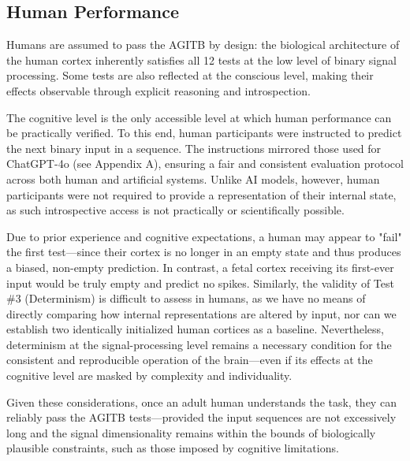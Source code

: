 \documentclass{article}
\begin{document}
\subsection{Human Performance}

Humans are assumed to pass the AGITB by design: the biological architecture of the human cortex inherently satisfies all 12 tests at the low level of binary signal processing. Some tests are also reflected at the conscious level, making their effects observable through explicit reasoning and introspection.

The cognitive level is the only accessible level at which human performance can be practically verified. To this end, human participants were instructed to predict the next binary input in a sequence. The instructions mirrored those used for ChatGPT-4o (see Appendix A), ensuring a fair and consistent evaluation protocol across both human and artificial systems. Unlike AI models, however, human participants were not required to provide a representation of their internal state, as such introspective access is not practically or scientifically possible.

Due to prior experience and cognitive expectations, a human may appear to "fail" the first test—since their cortex is no longer in an empty state and thus produces a biased, non-empty prediction. In contrast, a fetal cortex receiving its first-ever input would be truly empty and predict no spikes. Similarly, the validity of Test \#3 (Determinism) is difficult to assess in humans, as we have no means of directly comparing how internal representations are altered by input, nor can we establish two identically initialized human cortices as a baseline. Nevertheless, determinism at the signal-processing level remains a necessary condition for the consistent and reproducible operation of the brain—even if its effects at the cognitive level are masked by complexity and individuality.

Given these considerations, once an adult human understands the task, they can reliably pass the AGITB tests—provided the input sequences are not excessively long and the signal dimensionality remains within the bounds of biologically plausible constraints, such as those imposed by cognitive limitations.
\end{document}
